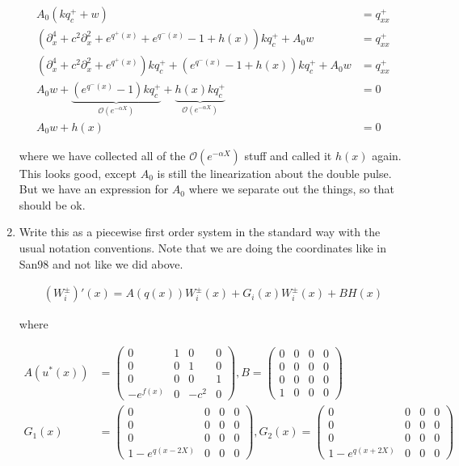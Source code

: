 \documentclass[12pt]{article}
\begin{document}
\begin{enumerate}
\begin{align*}
A_0 (k q^+_c + w) &= q^+_{xx} \\
(\partial_x^4 + c^2 \partial_x^2 + e^{q^+(x)} + e^{q^-(x)} - 1 + h(x))k q^+_c + A_0 w &= q^+_{xx} \\
(\partial_x^4 + c^2 \partial_x^2 + e^{q^+(x)})k q^+_c + (e^{q^-(x)} - 1 + h(x))kq^+_c + A_0 w &= q^+_{xx} \\
A_0 w + \underbrace{(e^{q^-(x)} - 1) kq^+_c}_{\mathcal{O}(e^{-\alpha X})} 
+ \underbrace{h(x) kq^+_c}_{\mathcal{O}(e^{-\alpha X})} &= 0 \\
A_0 w + h(x) &= 0
\end{align*}

where we have collected all of the $\mathcal{O}(e^{-\alpha X})$ stuff and called it $h(x)$ again. This looks good, except $A_0$ is still the linearization about the double pulse. But we have an expression for $A_0$ where we separate out the things, so that should be ok.

\item Write this as a piecewise first order system in the standard way with the usual notation conventions. Note that we are doing the coordinates like in San98 and not like we did above.

\begin{align*}
(W_i^\pm)'(x) = A(q(x)) W_i^\pm(x) + G_i(x) W_i^\pm(x)+ B H(x)
\end{align*}

where

\begin{align*}
A(u^*(x)) &= \begin{pmatrix}
0 & 1 & 0 & 0 \\
0 & 0 & 1 & 0 \\
0 & 0 & 0 & 1 \\
-e^{f(x)} & 0 & -c^2 & 0 
\end{pmatrix},
B = \begin{pmatrix}
0 & 0 & 0 & 0 \\
0 & 0 & 0 & 0 \\
0 & 0 & 0 & 0 \\
1 & 0 & 0 & 0 
\end{pmatrix} \\
G_1(x) &= \begin{pmatrix}
0 & 0 & 0 & 0 \\
0 & 0 & 0 & 0 \\
0 & 0 & 0 & 0 \\
1 - e^{q(x - 2 X)} & 0 & 0 & 0 
\end{pmatrix}, 
G_2(x) = \begin{pmatrix}
0 & 0 & 0 & 0 \\
0 & 0 & 0 & 0 \\
0 & 0 & 0 & 0 \\
1 - e^{q(x + 2 X)} & 0 & 0 & 0 
\end{pmatrix}
\end{align*}


\end{enumerate}
\end{document}
